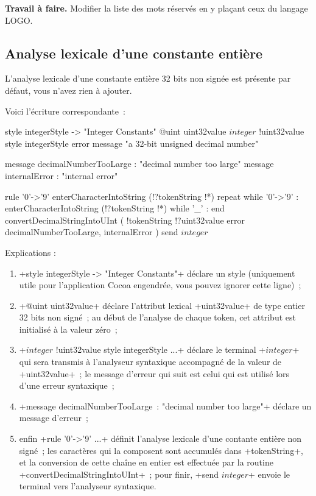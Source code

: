 \textbf{Travail à faire.} Modifier la liste des mots réservés en y plaçant ceux du langage LOGO.

\subsection{Analyse lexicale d'une constante entière}

L’analyse lexicale d’une constante entière 32 bits non signée est présente par défaut, vous n’avez rien à ajouter.

Voici l'écriture correspondante~:
\begin{galgas3}
style integerStyle -> "Integer Constants"
@uint uint32value
$integer$ !uint32value style integerStyle
               error message "a 32-bit unsigned decimal number"

message decimalNumberTooLarge : "decimal number too large"
message internalError : "internal error"

rule '0'->'9' {
  enterCharacterIntoString (!?tokenString !*)
  repeat
  while '0'->'9' :
    enterCharacterIntoString (!?tokenString !*)
  while '_' :
  end
  convertDecimalStringIntoUInt (
    !tokenString
    !?uint32value
    error decimalNumberTooLarge, internalError
  )
  send $integer$
}
\end{galgas3}


Explications :
\begin{enumerate}
  \item \ggst+style integerStyle -> "Integer Constants"+ déclare un style (uniquement utile pour l’application Cocoa engendrée, vous pouvez ignorer cette ligne)~;
  \item \ggst+@uint uint32value+ déclare l’attribut lexical \ggst+uint32value+ de type entier 32 bits non signé~; au début de l’analyse de chaque token, cet attribut est initialisé à la valeur zéro~;
  \item \ggst+$integer$ !uint32value style integerStyle ...+ déclare le terminal \ggst+$integer$+ qui sera transmis à l’analyseur syntaxique accompagné de la valeur de \ggst+uint32value+~;  le message d’erreur qui suit est celui qui est utilisé lors d’une erreur syntaxique~;
  \item \ggst+message decimalNumberTooLarge~: "decimal number too large"+ déclare un message d’erreur~;
  \item enfin \ggst+rule '0'->'9' ...+ définit l’analyse lexicale d’une contante entière non signé~; les caractères qui la composent sont accumulés dans \ggst+tokenString+, et la conversion de cette chaîne en entier est effectuée par la routine \ggst+convertDecimalStringIntoUInt+~; pour finir, \ggst+send $integer$+ envoie le terminal vers l’analyseur syntaxique.
\end{enumerate}

